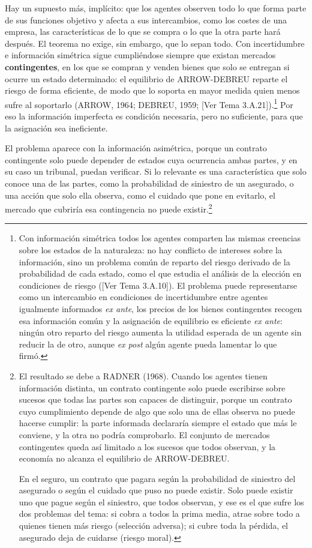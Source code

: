 \documentclass[10pt,a4paper]{article}
\newcommand{\authorfont}[1]{{\fontfamily{EBGaramond-TLF}\selectfont #1}}
\begin{document}
Hay un supuesto más, implícito: que los agentes observen todo lo que forma parte de sus funciones objetivo y afecta a sus intercambios, como los costes de una empresa, las características de lo que se compra o lo que la otra parte hará después. El teorema no exige, sin embargo, que lo sepan todo. Con incertidumbre e información simétrica sigue cumpliéndose siempre que existan mercados \textbf{contingentes}, en los que se compran y venden bienes que solo se entregan si ocurre un estado determinado: el equilibrio de ARROW-DEBREU reparte el riesgo de forma eficiente, de modo que lo soporta en mayor medida quien menos sufre al soportarlo (ARROW, 1964; DEBREU, 1959; [\authorfont{Ver Tema 3.A.21}]).\footnote{%
    Con información simétrica todos los agentes comparten las mismas creencias sobre los estados de la naturaleza: no hay conflicto de intereses sobre la información, sino un problema común de reparto del riesgo derivado de la probabilidad de cada estado, como el que estudia el análisis de la elección en condiciones de riesgo ([\authorfont{Ver Tema 3.A.10}]). El problema puede representarse como un intercambio en condiciones de incertidumbre entre agentes igualmente informados \textit{ex ante}, los precios de los bienes contingentes recogen esa información común y la asignación de equilibrio es eficiente \textit{ex ante}: ningún otro reparto del riesgo aumenta la utilidad esperada de un agente sin reducir la de otro, aunque \textit{ex post} algún agente pueda lamentar lo que firmó.
} Por eso la información imperfecta es condición necesaria, pero no suficiente, para que la asignación sea ineficiente.

El problema aparece con la información asimétrica, porque un contrato contingente solo puede depender de estados cuya ocurrencia ambas partes, y en su caso un tribunal, puedan verificar. Si lo relevante es una característica que solo conoce una de las partes, como la probabilidad de siniestro de un asegurado, o una acción que solo ella observa, como el cuidado que pone en evitarlo, el mercado que cubriría esa contingencia no puede existir.\footnote{%
    El resultado se debe a RADNER (1968). Cuando los agentes tienen información distinta, un contrato contingente solo puede escribirse sobre sucesos que todas las partes son capaces de distinguir, porque un contrato cuyo cumplimiento depende de algo que solo una de ellas observa no puede hacerse cumplir: la parte informada declararía siempre el estado que más le conviene, y la otra no podría comprobarlo. El conjunto de mercados contingentes queda así limitado a los sucesos que todos observan, y la economía no alcanza el equilibrio de ARROW-DEBREU.

    En el seguro, un contrato que pagara según la probabilidad de siniestro del asegurado o según el cuidado que puso no puede existir. Solo puede existir uno que pague según el siniestro, que todos observan, y ese es el que sufre los dos problemas del tema: si cobra a todos la prima media, atrae sobre todo a quienes tienen más riesgo (selección adversa); si cubre toda la pérdida, el asegurado deja de cuidarse (riesgo moral).
}
\end{document}

